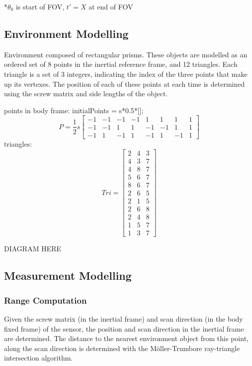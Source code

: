 *$\theta_0$ is start of FOV, $t'=X$ at end of FOV

\subsection{Environment Modelling}
Environment composed of rectangular prisms. These objects are modelled as an ordered set of 8 points in the inertial reference frame, and 12 triangles. Each triangle is a set of 3 integers, indicating the index of the three points that make up its vertexes.
The position of each of these points at each time is determined using the screw matrix and side lengths of the object.

points in body frame:
initialPoints = s*0.5*[];
\begin{equation}
	P = \frac{1}{2}s
	\begin{bmatrix}
		-1  &  -1  &  -1  &  -1  &   1  &   1  &   1  &  1 \\
		-1  &  -1  &   1  &   1  &  -1  &  -1  &   1  &  1 \\
		-1  &   1  &  -1  &   1  &  -1  &   1  &  -1  &  1 
	\end{bmatrix}
\end{equation}
triangles:
\begin{equation}
	Tri = 
	\begin{bmatrix}
	2 & 4 & 3 \\
    4 & 3 & 7 \\
    4 & 8 & 7 \\
    5 & 6 & 7 \\
    8 & 6 & 7 \\
    2 & 6 & 5 \\
    2 & 1 & 5 \\
    2 & 6 & 8 \\
    2 & 4 & 8 \\
    1 & 5 & 7 \\
    1 & 3 & 7
	\end{bmatrix}
\end{equation}

DIAGRAM HERE

\subsection{Measurement Modelling}
	\subsubsection{Range Computation}
	Given the screw matrix (in the inertial frame) and scan direction (in the body fixed frame) of the sensor, the position and scan direction in the inertial frame are determined.
	The distance to the nearest environment object from this point, along the scan direction is determined with the M{\"o}ller-Trumbore ray-triangle intersection algorithm.

